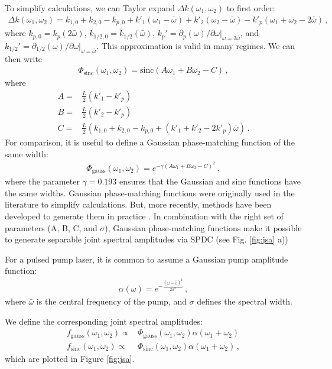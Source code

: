 \documentclass[12pt]{article}
\begin{document}
To simplify calculations, we can Taylor expand $\Delta k(\omega_1,\omega_2)$ to first order:
\begin{align}
\Delta k(\omega_1,\omega_2)=k_{1,0}+k_{2,0}-k_{p,0}+k'_{1}(\omega_1-\bar\omega)+k'_{2}(\omega_2-\bar\omega)-k'_{p}(\omega_1+\omega_2-2\bar\omega)\,,
\end{align}
where $k_{p,0}=k_p(2\bar\omega)$,  $k_{1/2,0}=k_{1/2}(\bar\omega)$, $k_p'=\partial_p(\omega)/\partial\omega|_{\omega=2\bar\omega}$, and $k_{1/2}'=\partial_{1/2}(\omega)/\partial\omega|_{\omega=\bar\omega}$.   This approximation is valid in many regimes. We can then write
\begin{align}\label{eq:sinccc}
\Phi_{\mathrm{sinc}}(\omega_1,\omega_2)=\mathrm{sinc}\left(A\omega_1+B\omega_2-C\right)\,,
\end{align}
where 
\begin{align}
A={}&\frac{L}{2}(k'_{1}-k'_{p})\\
B={}&\frac{L}{2}(k'_{2}-k'_{p})\\
C={}&\frac{L}{2}(k_{1,0}+k_{2,0}-k_{p,0}+(k'_{1}+k'_{2}-2k'_{p})\bar\omega)\,.
\end{align}
For comparison, it is useful to define a Gaussian phase-matching function of the same width:
\begin{align}\label{eq:gausss}
\Phi_{\mathrm{gauss}}(\omega_1,\omega_2)=e^{-\gamma\left(A\omega_1+B\omega_2-C\right)^2}\,,
\end{align}
where the parameter $\gamma=0.193$ ensures that the Gaussian and sinc functions have the same widths. Gaussian phase-matching functions were originally used in the literature to simplify calculations. But, more recently, methods have been developed to generate them in practice \cite{Branczyk2011, Dixon2013, Dosseva2016, Tambasco2016, Graffitti2017}. In combination with the right set of parameters (A, B, C, and $\sigma$), Gaussian phase-matching functions make it possible to  generate  separable joint spectral amplitudes via SPDC (see Fig. \ref{fig:jsa} a))

For a pulsed pump laser, it is common to assume a Gaussian pump amplitude function:
\begin{align}
\alpha(\omega)=e^{-\frac{(\omega-\bar\omega)^2}{2\sigma^2}}\,,
\end{align}
where $\bar\omega$ is the central frequency of the pump, and $\sigma$ defines the spectral width. 

We define the corresponding joint spectral amplitudes:
\begin{align}\label{eq:fgauss}
f_{\mathrm{gauss}}(\omega_1,\omega_2)\propto {}&\Phi_{\mathrm{gauss}}(\omega_{1},\omega_{2})\alpha(\omega_{1}+\omega_{2})\\\label{eq:fsinc}
f_{\mathrm{sinc}}(\omega_1,\omega_2)\propto {}&\Phi_{\mathrm{sinc}}(\omega_{1},\omega_{2})\alpha(\omega_{1}+\omega_{2})\,,
\end{align}
which are plotted in Figure \ref{fig:jsa}.
\end{document}
